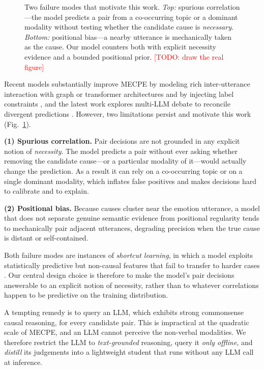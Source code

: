 \documentclass[journal]{IEEEtran}
\newcommand{\todo}[1]{\textcolor{red}{[TODO: #1]}}
\newcommand{\phbox}[2]{%
  \fbox{\parbox[c][#1][c]{\dimexpr#2-2\fboxsep-2\fboxrule\relax}{%
  \centering\itshape\small Placeholder figure --- replace with the real graphic.}}}
\begin{document}
\begin{figure}[t]
  \centering
  \phbox{4.2cm}{\columnwidth}
  \caption{Two failure modes that motivate this work. \emph{Top:} spurious
  correlation---the model predicts a pair from a co-occurring topic or a dominant
  modality without testing whether the candidate cause is \emph{necessary}.
  \emph{Bottom:} positional bias---a nearby utterance is mechanically taken as the
  cause. Our model counters both with explicit necessity evidence and a bounded
  positional prior. \todo{draw the real figure}}
  \label{fig:motivation}
\end{figure}

Recent models substantially improve MECPE by modeling rich inter-utterance
interaction with graph or transformer architectures and by injecting label
constraints \cite{li2024hilo}, and the latest work explores multi-LLM debate to
reconcile divergent predictions \cite{wu2025decdebate}. However, two limitations
persist and motivate this work (Fig.~\ref{fig:motivation}).

\noindent\textbf{(1) Spurious correlation.} Pair decisions are not grounded in any
explicit notion of \emph{necessity}. The model predicts a pair without ever asking
whether removing the candidate cause---or a particular modality of it---would
actually change the prediction. As a result it can rely on a co-occurring topic or
on a single dominant modality, which inflates false positives and makes decisions
hard to calibrate and to explain.

\noindent\textbf{(2) Positional bias.} Because causes cluster near the emotion
utterance, a model that does not separate genuine semantic evidence from positional
regularity tends to mechanically pair adjacent utterances, degrading precision when
the true cause is distant or self-contained.

Both failure modes are instances of \emph{shortcut learning}, in which a model exploits
statistically predictive but non-causal features that fail to transfer to harder cases
\cite{geirhos2020shortcut}. Our central design choice is therefore to make the model's
pair decisions answerable to an explicit notion of necessity, rather than to whatever
correlations happen to be predictive on the training distribution.

A tempting remedy is to query an LLM, which exhibits strong commonsense causal
reasoning, for every candidate pair. This is impractical at the quadratic scale of
MECPE, and an LLM cannot perceive the non-verbal modalities. We therefore restrict
the LLM to \emph{text-grounded} reasoning, query it \emph{only offline}, and
\emph{distill} its judgements into a lightweight student that runs without any LLM
call at inference.
\end{document}
